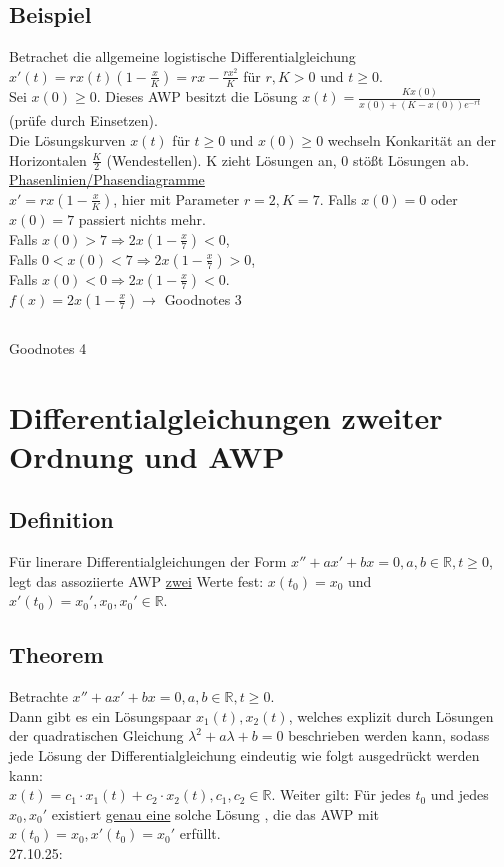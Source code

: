 \documentclass[12pt,a4paper]{article}
\newcommand{\DGL}{Differentialgleichung }
\newcommand{\DGLs}{Differentialgleichungen }
\newcommand{\Lsg}{Lösung }
\newcommand{\LSG}{Lösungen }
\begin{document}
\subsection{Beispiel}
Betrachet die allgemeine logistische \DGL $x'(t) = rx(t)(1-\frac{x}{K}) = rx-\frac{rx^2}{K}$ für $r,K > 0$ und $t \geq 0$. \\
Sei $x(0) \geq 0$. Dieses AWP besitzt die \Lsg $x(t) = \frac{Kx(0)}{x(0)+(K-x(0))e^{-rt}}$ (prüfe durch Einsetzen). \\
Die Lösungskurven $x(t)$ für $t \geq 0$ und $x(0) \geq 0$ wechseln Konkarität an der Horizontalen $\frac{K}{2}$ (Wendestellen). K zieht Lösungen an, 0 stößt Lösungen ab. \\
\underline{Phasenlinien/Phasendiagramme} \\
$x'=rx(1-\frac{x}{K})$, hier mit Parameter $r=2, K=7$. Falls $x(0) = 0$ oder $x(0) = 7$ passiert nichts mehr. \\
Falls $x(0) > 7 \Rightarrow 2x(1-\frac{x}{7}) < 0$, \\
Falls $0 < x(0) < 7 \Rightarrow 2x(1-\frac{x}{7}) > 0$, \\
Falls $x(0) < 0 \Rightarrow 2x(1-\frac{x}{7}) < 0$. \\
$f(x) = 2x(1-\frac{x}{7}) \rightarrow$ Goodnotes 3
\subsection{}
Goodnotes 4
\section{\DGLs zweiter Ordnung und AWP}
\subsection{Definition}
Für linerare \DGLs der Form $x'' + ax' + bx = 0, a,b \in \mathbb{R}, t \geq 0$, legt das assoziierte AWP \underline{zwei} Werte fest: $x(t_0) = x_0$ und $x'(t_0) = x_0', x_0, x_0' \in \mathbb{R}$.
\subsection{Theorem}
Betrachte $x'' + ax' + bx = 0, a,b \in \mathbb{R}, t \geq 0$. \\
Dann gibt es ein Lösungspaar $x_1(t), x_2(t)$, welches explizit durch \LSG der quadratischen Gleichung $\lambda^2+a\lambda+b=0$ beschrieben werden kann, sodass jede \Lsg der \DGL eindeutig wie folgt ausgedrückt werden kann: \\
$x(t) = c_1 \cdot x_1(t) + c_2 \cdot x_2(t), c_1, c_2 \in \mathbb{R}$. Weiter gilt: Für jedes $t_0$ und jedes $x_0, x_0'$ existiert \underline{genau eine} solche \Lsg, die das AWP mit $x(t_0) = x_0, x'(t_0) = x_0'$ erfüllt. \\
27.10.25:
\end{document}
